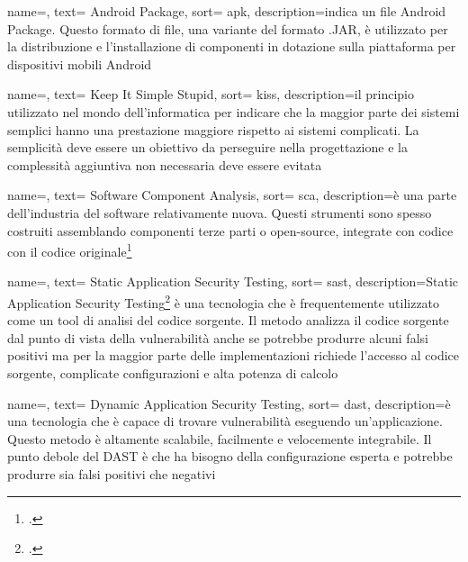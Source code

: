 {
name=,
text= Android Package,
sort= apk,
description={indica un file Android Package.
Questo formato di file, una variante del formato .JAR, è utilizzato per la distribuzione e l'installazione di componenti in dotazione sulla piattaforma per dispositivi mobili Android}
}

{
name=,
text= Keep It Simple Stupid,
sort= kiss,
description={il principio utilizzato nel mondo dell'informatica per indicare che la maggior parte dei sistemi semplici hanno una prestazione maggiore rispetto ai sistemi complicati.
La semplicità deve essere un obiettivo da perseguire nella progettazione e la complessità aggiuntiva non necessaria deve essere evitata}
}

{
name=,
text= Software Component Analysis,
sort= sca,
description={è una parte dell'industria del software relativamente nuova.
Questi strumenti sono spesso costruiti assemblando componenti terze parti o open-source, integrate con codice con il codice originale\footcite{site:sca}}
}

{
name=,
text= Static Application Security Testing,
sort= sast,
description={Static Application Security Testing\footcite{site:sast} è una tecnologia che è frequentemente utilizzato come un tool di analisi del codice sorgente.
Il metodo analizza il codice sorgente dal punto di vista della vulnerabilità anche se potrebbe produrre alcuni falsi positivi ma per la maggior parte delle implementazioni richiede l'accesso al codice sorgente, complicate configurazioni e alta potenza di calcolo}
}


{
name=,
text= Dynamic Application Security Testing,
sort= dast,
description={è una tecnologia che è capace di trovare vulnerabilità eseguendo un'applicazione.
Questo metodo è altamente scalabile, facilmente e velocemente integrabile.
Il punto debole del DAST è che ha bisogno della configurazione esperta e potrebbe produrre sia falsi positivi che negativi}
}

